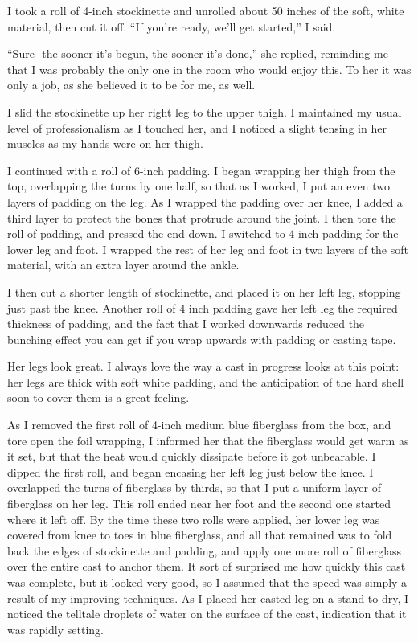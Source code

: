 I took a roll of 4-inch stockinette and unrolled about 50 inches of the soft, white
material, then cut it off. ``If you're ready, we'll get started,'' I said.

``Sure- the sooner it's begun, the sooner it's done,'' she replied, reminding me that I was
probably the only one in the room who would enjoy this. To her it was only a job, as she
believed it to be for me, as well.

I slid the stockinette up her right leg to the upper thigh. I maintained my usual level of
professionalism as I touched her, and I noticed a slight tensing in her muscles as my hands were
on her thigh.

I continued with a roll of 6-inch padding. I began wrapping her thigh from the top,
overlapping the turns by one half, so that as I worked, I put an even two layers of padding on
the leg. As I wrapped the padding over her knee, I added a third layer to protect the bones that
protrude around the joint. I then tore the roll of padding, and pressed the end down. I switched
to 4-inch padding for the lower leg and foot. I wrapped the rest of her leg and foot in two
layers of the soft material, with an extra layer around the ankle.

I then cut a shorter length of stockinette, and placed it on her left leg, stopping just
past the knee. Another roll of 4 inch padding gave her left leg the required thickness of
padding, and the fact that I worked downwards reduced the bunching effect you can get if you
wrap upwards with padding or casting tape.

Her legs look great. I always love the way a cast in progress looks at this point: her legs
are thick with soft white padding, and the anticipation of the hard shell soon to cover them is
a great feeling.

As I removed the first roll of 4-inch medium blue fiberglass from the box, and tore open the
foil wrapping, I informed her that the fiberglass would get warm as it set, but that the heat
would quickly dissipate before it got unbearable. I dipped the first roll, and began encasing
her left leg just below the knee. I overlapped the turns of fiberglass by thirds, so that I put
a uniform layer of fiberglass on her leg. This roll ended near her foot and the second one
started where it left off. By the time these two rolls were applied, her lower leg was covered
from knee to toes in blue fiberglass, and all that remained was to fold back the edges of
stockinette and padding, and apply one more roll of fiberglass over the entire cast to anchor
them. It sort of surprised me how quickly this cast was complete, but it looked very good, so I
assumed that the speed was simply a result of my improving techniques. As I placed her casted
leg on a stand to dry, I noticed the telltale droplets of water on the surface of the cast,
indication that it was rapidly setting.

